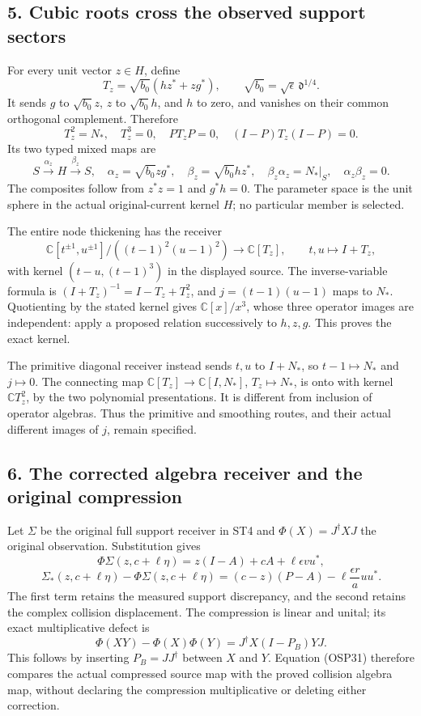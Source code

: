 \documentclass[
]{article}
\begin{document}
\subsection{5. Cubic roots cross the observed support
sectors}\label{cubic-roots-cross-the-observed-support-sectors}

For every unit vector \(z\in H\), define \[
T_z=\sqrt{b_0}(hz^*+zg^*),\qquad
\sqrt{b_0}=\sqrt\epsilon\,\mathfrak d^{1/4}.
\tag{OSP27}
\] It sends \(g\) to \(\sqrt{b_0}z\), \(z\) to \(\sqrt{b_0}h\), and
\(h\) to zero, and vanishes on their common orthogonal complement.
Therefore \[
T_z^2=N_*,\quad T_z^3=0,\quad
PT_zP=0,\quad (I-P)T_z(I-P)=0.
\tag{OSP28}
\] Its two typed mixed maps are \[
S\xrightarrow{\alpha_z}H\xrightarrow{\beta_z}S,
\quad\alpha_z=\sqrt{b_0}zg^*,\quad
\beta_z=\sqrt{b_0}hz^*,\quad
\beta_z\alpha_z=N_*|_S,\quad\alpha_z\beta_z=0.
\tag{OSP29}
\] The composites follow from \(z^*z=1\) and \(g^*h=0\). The parameter
space is the unit sphere in the actual original-current kernel \(H\); no
particular member is selected.

The entire node thickening has the receiver \[
\mathbb C[t^{\pm1},u^{\pm1}]/((t-1)^2(u-1)^2)
\longrightarrow\mathbb C[T_z],\qquad t,u\longmapsto I+T_z,
\tag{OSP30}
\] with kernel \((t-u,(t-1)^3)\) in the displayed source. The
inverse-variable formula is \((I+T_z)^{-1}=I-T_z+T_z^2\), and
\(j=(t-1)(u-1)\) maps to \(N_*\). Quotienting by the stated kernel gives
\(\mathbb C[x]/x^3\), whose three operator images are independent: apply
a proposed relation successively to \(h,z,g\). This proves the exact
kernel.

The primitive diagonal receiver instead sends \(t,u\) to \(I+N_*\), so
\(t-1\mapsto N_*\) and \(j\mapsto0\). The connecting map
\(\mathbb C[T_z]\to\mathbb C[I,N_*]\), \(T_z\mapsto N_*\), is onto with
kernel \(\mathbb CT_z^2\), by the two polynomial presentations. It is
different from inclusion of operator algebras. Thus the primitive and
smoothing routes, and their actual different images of \(j\), remain
specified.

\subsection{6. The corrected algebra receiver and the original
compression}\label{the-corrected-algebra-receiver-and-the-original-compression}

Let \(\Sigma\) be the original full support receiver in ST4 and
\(\Phi(X)=J^\dagger XJ\) the original observation. Substitution gives \[
\Phi\Sigma(z,c+\ell\eta)=z(I-A)+cA+\ell\epsilon vu^*,
\] \[
\Sigma_*(z,c+\ell\eta)-\Phi\Sigma(z,c+\ell\eta)
=(c-z)(P-A)-\ell\frac{\epsilon r}{a}uu^*.
\tag{OSP31}
\] The first term retains the measured support discrepancy, and the
second retains the complex collision displacement. The compression is
linear and unital; its exact multiplicative defect is \[
\Phi(XY)-\Phi(X)\Phi(Y)=J^\dagger X(I-P_B)YJ.
\tag{OSP32}
\] This follows by inserting \(P_B=JJ^\dagger\) between \(X\) and \(Y\).
Equation (OSP31) therefore compares the actual compressed source map
with the proved collision algebra map, without declaring the compression
multiplicative or deleting either correction.
\end{document}
